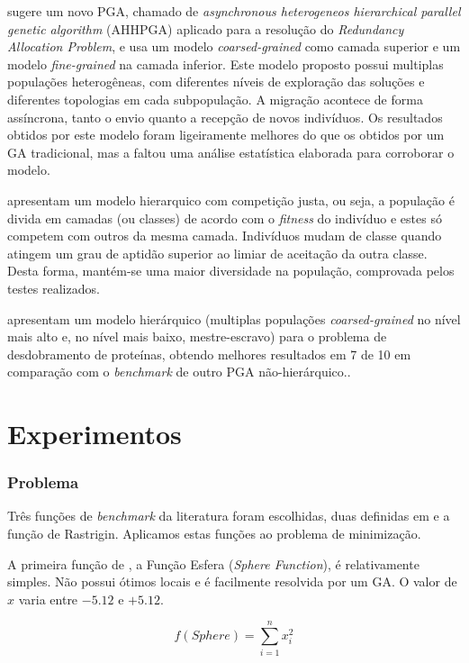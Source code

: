 \documentclass[12pt]{article}
\begin{document}
 \cite{zeng2007} sugere um novo PGA, chamado de \emph{asynchronous heterogeneos hierarchical parallel genetic algorithm} (AHHPGA) aplicado para a resolução do \emph{Redundancy Allocation Problem}, e usa um modelo \emph{coarsed-grained} como camada superior e um modelo \emph{fine-grained} na camada inferior. Este modelo proposto possui multiplas populações heterogêneas, com diferentes níveis de exploração das soluções e diferentes topologias em cada subpopulação. A migração acontece de forma assíncrona, tanto o envio quanto a recepção de novos indivíduos. Os resultados obtidos por este modelo foram ligeiramente melhores do que os obtidos por um GA tradicional, mas a faltou uma análise estatística elaborada para corroborar o modelo. 

\cite{heesung2009} apresentam um modelo hierarquico com competição justa, ou seja, a população é divida em camadas (ou classes) de acordo com o \emph{fitness} do indivíduo e estes só competem com outros da mesma camada. Indivíduos mudam de classe quando atingem um grau de aptidão superior ao limiar de aceitação da outra classe. Desta forma, mantém-se uma maior diversidade na população, comprovada pelos testes realizados.

 \cite{benitez2010} apresentam um modelo hierárquico (multiplas populações \emph{coarsed-grained} no nível mais alto e, no nível mais baixo, mestre-escravo) para o problema de desdobramento de proteínas, obtendo melhores resultados em 7 de 10 em comparação com o \emph{benchmark} de outro PGA não-hierárquico..


\section{Experimentos} %
\label{sec:experimentos}

\subsubsection{Problema} %
\label{ssub:problema}

Três funções de \emph{benchmark} da literatura foram escolhidas, duas definidas em \cite{dejong1975} e a função de Rastrigin. Aplicamos estas funções ao problema de minimização.

A primeira função de \cite{dejong1975}, a Função Esfera (\emph{Sphere Function}), é relativamente simples. Não possui ótimos locais e é facilmente resolvida por um GA. O valor de $x$ varia entre $-5.12$ e $+5.12$.

\[
  f(Sphere) = \sum_{i = 1}^{n} x_{i}^2
\]
\end{document}
